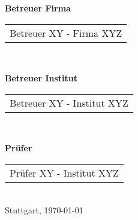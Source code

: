 \vspace{0.5cm}
\begin{flushleft}	
	\begin{minipage}[]{1\textwidth}
		\begingroup
		\begin{minipage}[t]{0.5\textwidth}
			\textbf{Betreuer Firma}
		\end{minipage}%
		\hfill
		\begin{minipage}[t]{0.5\textwidth}
			\begin{tabular}{l}
				\\ \cline{1-1}
				\phantom{12}Betreuer XY - Firma XYZ\phantom{12}
			\end{tabular}
			
		\end{minipage}%
		\par\endgroup
	\end{minipage}
	\\
	\vspace{1cm}
	\begin{minipage}[]{1\textwidth}
		\begingroup
		\begin{minipage}[t]{0.5\textwidth}
			\textbf{Betreuer Institut}
		\end{minipage}%
		\hfill
		\begin{minipage}[t]{0.5\textwidth}
			\begin{tabular}{l}
				\\ \cline{1-1}
				\phantom{12}Betreuer XY - Institut XYZ\phantom{1}
			\end{tabular}
			
		\end{minipage}%
		\par\endgroup
	\end{minipage}
	\\
	\vspace{1cm}
	\begin{minipage}[]{1\textwidth}
		\begingroup
		\begin{minipage}[t]{0.5\textwidth}
			\textbf{Prüfer}
		\end{minipage}%
		\hfill
		\begin{minipage}[t]{0.5\textwidth}
			\begin{tabular}{l}
				\\ \cline{1-1}
				\phantom{12}Prüfer XY - Institut XYZ\phantom{123}
			\end{tabular}
			
		\end{minipage}%
		\par\endgroup
	\end{minipage}
	\\	
	\vspace{0.5cm}
	Stuttgart, \today
\end{flushleft}